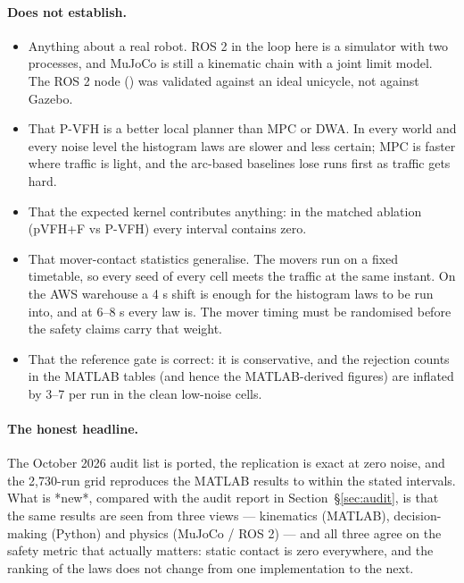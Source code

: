 \paragraph{Does not establish.}
\begin{itemize}[leftmargin=1.6em]
\item Anything about a real robot. ROS 2 in the loop here is a simulator
with two processes, and MuJoCo is still a kinematic chain with a joint limit
model. The ROS 2 node () was validated against
an ideal unicycle, not against Gazebo.
\item That P-VFH is a better local planner than MPC or DWA. In every world
and every noise level the histogram laws are slower and less certain; MPC is
faster where traffic is light, and the arc-based baselines lose runs first
as traffic gets hard.
\item That the expected kernel contributes anything: in the matched
ablation (pVFH+F vs P-VFH) every interval contains zero.
\item That mover-contact statistics generalise. The movers run on a fixed
timetable, so every seed of every cell meets the traffic at the same instant.
On the AWS warehouse a 4 s shift is enough for the histogram laws to be run
into, and at 6--8 s every law is. The mover timing must be randomised before
the safety claims carry that weight.
\item That the reference gate is correct: it is conservative, and the
rejection counts in the MATLAB tables (and hence the MATLAB-derived figures)
are inflated by 3--7 per run in the clean low-noise cells.
\end{itemize}

\paragraph{The honest headline.} The October 2026 audit list is ported, the
replication is exact at zero noise, and the 2,730-run grid reproduces the
MATLAB results to within the stated intervals. What is *new*, compared with
the audit report in Section~\S\ref{sec:audit}, is that the same results are
seen from three views --- kinematics (MATLAB), decision-making (Python) and
physics (MuJoCo / ROS 2) --- and all three agree on the safety metric that
actually matters: static contact is zero everywhere, and the ranking of the
laws does not change from one implementation to the next.

